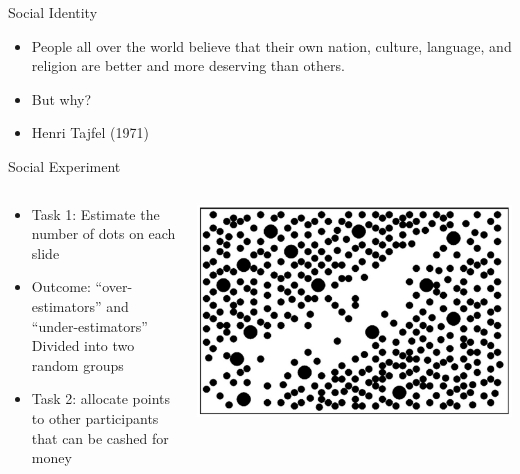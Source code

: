 \documentclass[
  ignorenonframetext,
  aspectratio=169,
]{beamer}
\providecommand{\tightlist}{%
  \setlength{\itemsep}{0pt}\setlength{\parskip}{0pt}}\usepackage{longtable,booktabs,array}
\begin{document}
\begin{frame}{Social Identity}
\label{social-identity-1}
\begin{itemize}[<+->]
\tightlist
\item
  People all over the world believe that their own nation, culture,
  language, and religion are better and more deserving than others.
\item
  But why?
\item
  Henri Tajfel (1971)
\end{itemize}
\end{frame}

\begin{frame}{Social Experiment}
\label{social-experiment}
\begin{columns}[c,totalwidth=8em]
\begin{column}{0.4\textwidth}
\begin{itemize}[<+->]
\tightlist
\item
  Task 1: Estimate the number of dots on each slide
\item
  Outcome: ``over-estimators'' and ``under-estimators'' Divided into two
  random groups
\item
  Task 2: allocate points to other participants that can be cashed for
  money
\end{itemize}
\end{column}

\begin{column}{0.6\textwidth}
\includegraphics{tajfel.png}
\end{column}
\end{columns}
\end{frame}
\end{document}

